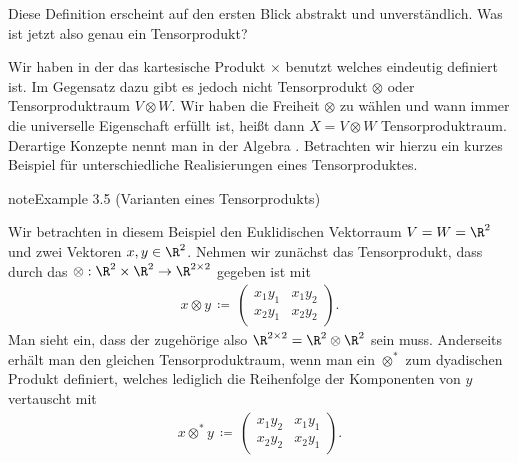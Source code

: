 \documentclass[letterpaper,10pt,english]{jupyterBook}
\begin{document}
\sphinxAtStartPar
Diese Definition erscheint auf den ersten Blick abstrakt und unverständlich.
Was ist jetzt also genau ein Tensorprodukt?

\sphinxAtStartPar
{}

\sphinxAtStartPar
Wir haben in der {\hyperref[\detokenize{vektoranalysis/tensor:def:tensor}]{}} das kartesische Produkt \(\times\) benutzt welches eindeutig definiert ist.
Im Gegensatz dazu gibt es jedoch nicht  Tensorprodukt \(\otimes\) oder  Tensorproduktraum \(V\otimes W\).
Wir haben die Freiheit \(\otimes\) zu wählen und wann immer die universelle Eigenschaft erfüllt ist, heißt dann \(X = V\otimes W\) Tensorproduktraum.
Derartige Konzepte nennt man in der Algebra .
Betrachten wir hierzu ein kurzes Beispiel für unterschiedliche Realisierungen eines Tensorproduktes.
\label{vektoranalysis/tensor:ex:tensorproduktVarianten}
\begin{sphinxadmonition}{note}{Example 3.5 (Varianten eines Tensorprodukts)}



\sphinxAtStartPar
Wir betrachten in diesem Beispiel den Euklidischen Vektorraum \(V=W=\R^2\) und zwei Vektoren \(x, y \in \R^2\).
Nehmen wir zunächst das Tensorprodukt, dass durch das  \(\otimes : \R^2 \times \R^2 \rightarrow \R^{2 \times 2}\) gegeben ist mit
\begin{equation*}
\begin{split}x \otimes y \, \coloneqq \,
\begin{pmatrix}
x_1y_1 & x_1y_2 \\
x_2y_1 & x_2y_2
\end{pmatrix}.\end{split}
\end{equation*}
\sphinxAtStartPar
Man sieht ein, dass der zugehörige  also \(\R^{2 \times 2} = \R^2 \otimes \R^2\) sein muss.
Anderseits erhält man den gleichen Tensorproduktraum, wenn man ein  \(\otimes^*\) zum dyadischen Produkt definiert, welches lediglich die Reihenfolge der Komponenten von \(y\) vertauscht mit
\begin{equation*}
\begin{split}x \otimes^* y \, \coloneqq \,
\begin{pmatrix}
x_1y_2 & x_1y_1 \\
x_2y_2 & x_2y_1
\end{pmatrix}.\end{split}
\end{equation*}\end{sphinxadmonition}
\end{document}
